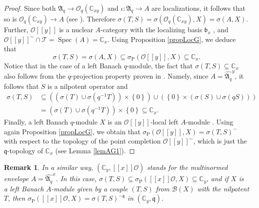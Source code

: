 \documentclass[12pt]{amsart}%
\theoremstyle{plain}
\newtheorem{remark}{Remark}
\numberwithin{equation}{section}
\numberwithin{equation}{section}
\numberwithin{theorem}{section}
\numberwithin{lemma}{section}
\numberwithin{remark}{section}
\numberwithin{example}{section}
\numberwithin{proposition}{section}
\numberwithin{definition}{section}
\numberwithin{corollary}{section}
\begin{document}
\begin{proof}
Since both $\mathfrak{A}_{q}\rightarrow\mathcal{O}_{q}\left(  \mathbb{C}%
_{xy}\right)  $ and $\iota:\mathfrak{A}_{q}\rightarrow A$ are localizations,
it follows that so is $\mathcal{O}_{q}\left(  \mathbb{C}_{xy}\right)
\rightarrow A$ (see \cite[Proposition 1.8]{Tay2}). Therefore $\sigma\left(
T,S\right)  =\sigma\left(  \mathcal{O}_{q}\left(  \mathbb{C}_{xy}\right)
,X\right)  =\sigma\left(  A,X\right)  $. Further, $\mathcal{O}\left[  \left[
y\right]  \right]  $ is a nuclear $A$-category with the localizing basis
$\mathfrak{b}_{x}$ \cite{DosiLoc}, and $\mathcal{O}\left[  \left[  y\right]
\right]  ^{\sim}\cap\mathcal{T}=\operatorname{Spec}\left(  A\right)
=\mathbb{C}_{x}$. Using Proposition \ref{propLocG}, we deduce that
\[
\sigma\left(  T,S\right)  =\sigma\left(  A,X\right)  \subseteq\sigma
_{\operatorname{P}}\left(  \mathcal{O}\left[  \left[  y\right]  \right]
,X\right)  \subseteq\mathbb{C}_{x}.
\]
Notice that in the case of a left Banach $q$-module, the fact that
$\sigma\left(  T,S\right)  \subseteq\mathbb{C}_{x}$ also follows from the
$q$-projection property proven in \cite{Dosi242}. Namely, since
$A=\widehat{\mathfrak{A}_{q}}^{y}$, it follows that $S$ is a nilpotent
operator and
\begin{align*}
\sigma\left(  T,S\right)   &  \subseteq\left(  \left(  \sigma\left(  T\right)
\cup\sigma\left(  q^{-1}T\right)  \right)  \times\left\{  0\right\}  \right)
\cup\left(  \left\{  0\right\}  \times\left(  \sigma\left(  S\right)
\cup\sigma\left(  qS\right)  \right)  \right) \\
&  =\left(  \sigma\left(  T\right)  \cup\sigma\left(  q^{-1}T\right)  \right)
\times\left\{  0\right\}  \subseteq\mathbb{C}_{x}.
\end{align*}
Finally, a left Banach $q$-module $X$ is an $\mathcal{O}\left[  \left[
y\right]  \right]  $\textit{-}local left $A$-module \cite[Theorem 6.3]%
{Dosi25}. Using again Proposition \ref{propLocG}, we obtain that
$\sigma_{\operatorname{P}}\left(  \mathcal{O}\left[  \left[  y\right]
\right]  ,X\right)  =\sigma\left(  T,S\right)  ^{-}$ with respect to the
topology of the point completion $\mathcal{O}\left[  \left[  y\right]
\right]  ^{\sim}$, which is just the $\mathfrak{q}$-topology of $\mathbb{C}%
_{x}$ (see Lemma \ref{lemAG1}).
\end{proof}

\begin{remark}
\label{remxO}In a similar way, $\left(  \mathbb{C}_{y},\left[  \left[
x\right]  \right]  \mathcal{O}\right)  $ stands for the multinormed envelope
$A=\widehat{\mathfrak{A}_{q}}^{x}$. In this case, $\sigma\left(  T,S\right)
\subseteq\sigma_{\operatorname{P}}\left(  \left[  \left[  x\right]  \right]
\mathcal{O},X\right)  \subseteq\mathbb{C}_{y}$, and if $X$ is a left Banach
$A$-module given by a couple $\left(  T,S\right)  $ from $\mathcal{B}\left(
X\right)  $ with the nilpotent $T$, then $\sigma_{\operatorname{P}}\left(
\left[  \left[  x\right]  \right]  \mathcal{O},X\right)  =\sigma\left(
T,S\right)  ^{-\mathfrak{q}}$ in $\left(  \mathbb{C}_{y},\mathfrak{q}\right)
$.
\end{remark}
\end{document}
